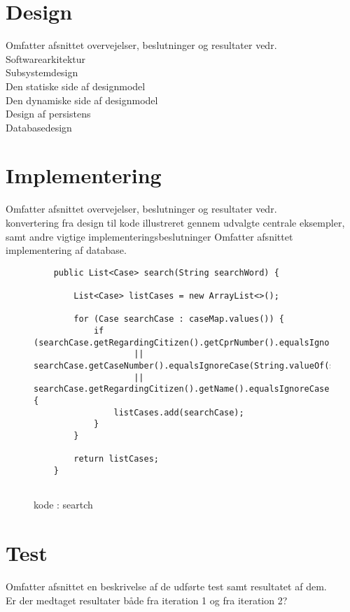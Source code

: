 \section{Design}
Omfatter afsnittet overvejelser, beslutninger og resultater vedr.\\
Softwarearkitektur\\
Subsystemdesign\\
Den statiske side af designmodel\\
Den dynamiske side af designmodel\\
Design af persistens\\
Databasedesign\\
\section{Implementering}
Omfatter afsnittet overvejelser, beslutninger og resultater vedr.\\  konvertering fra design til kode illustreret gennem udvalgte centrale eksempler, samt andre vigtige implementeringsbeslutninger
Omfatter afsnittet implementering af database.


\begin{figure}
\begin{lstlisting}
    public List<Case> search(String searchWord) {

        List<Case> listCases = new ArrayList<>();

        for (Case searchCase : caseMap.values()) {
            if (searchCase.getRegardingCitizen().getCprNumber().equalsIgnoreCase(searchWord)
                    || searchCase.getCaseNumber().equalsIgnoreCase(String.valueOf(searchWord))
                    || searchCase.getRegardingCitizen().getName().equalsIgnoreCase(searchWord)) {
                listCases.add(searchCase);
            }
        }

        return listCases;
    }


\end{lstlisting}
\caption{kode : seartch}
\label{kode:Search}
\end{figure}


\section{Test}
Omfatter afsnittet en beskrivelse af de udførte test samt resultatet af dem.\\
Er der medtaget resultater både fra iteration 1 og fra iteration 2?\\
